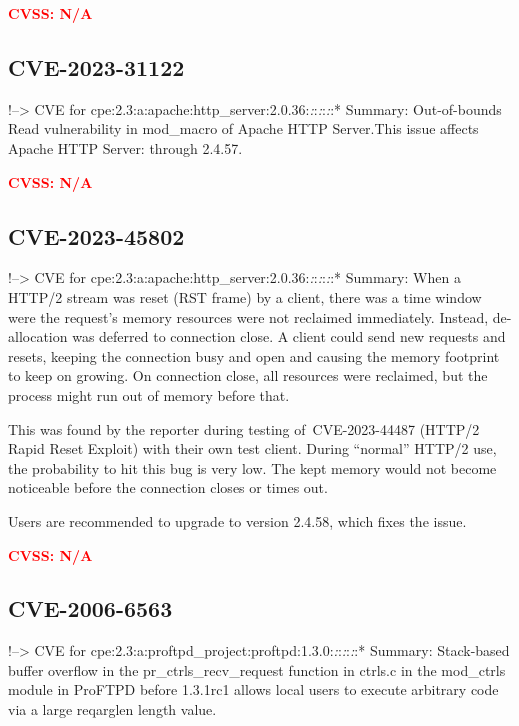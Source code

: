 \documentclass[a4paper, 12pt]{article}
\begin{document}
\textbf{\textcolor{red}{CVSS: N/A}}

\hypertarget{cve-2023-31122}{%
\subsection{CVE-2023-31122}\label{cve-2023-31122}}

!--\textgreater{} CVE for
cpe:2.3:a:apache:http\_server:2.0.36:\emph{:}:\emph{:}:\emph{:}:*
Summary: Out-of-bounds Read vulnerability in mod\_macro of Apache HTTP
Server.This issue affects Apache HTTP Server: through 2.4.57.

\textbf{\textcolor{red}{CVSS: N/A}}

\hypertarget{cve-2023-45802}{%
\subsection{CVE-2023-45802}\label{cve-2023-45802}}

!--\textgreater{} CVE for
cpe:2.3:a:apache:http\_server:2.0.36:\emph{:}:\emph{:}:\emph{:}:*
Summary: When a HTTP/2 stream was reset (RST frame) by a client, there
was a time window were the request's memory resources were not reclaimed
immediately. Instead, de-allocation was deferred to connection close. A
client could send new requests and resets, keeping the connection busy
and open and causing the memory footprint to keep on growing. On
connection close, all resources were reclaimed, but the process might
run out of memory before that.

This was found by the reporter during testing of~CVE-2023-44487 (HTTP/2
Rapid Reset Exploit) with their own test client. During ``normal''
HTTP/2 use, the probability to hit this bug is very low. The kept memory
would not become noticeable before the connection closes or times out.

Users are recommended to upgrade to version 2.4.58, which fixes the
issue.

\textbf{\textcolor{red}{CVSS: N/A}}

\hypertarget{cve-2006-6563}{%
\subsection{CVE-2006-6563}\label{cve-2006-6563}}

!--\textgreater{} CVE for
cpe:2.3:a:proftpd\_project:proftpd:1.3.0:\emph{:}:\emph{:}:\emph{:}:*
Summary: Stack-based buffer overflow in the pr\_ctrls\_recv\_request
function in ctrls.c in the mod\_ctrls module in ProFTPD before 1.3.1rc1
allows local users to execute arbitrary code via a large reqarglen
length value.
\end{document}
